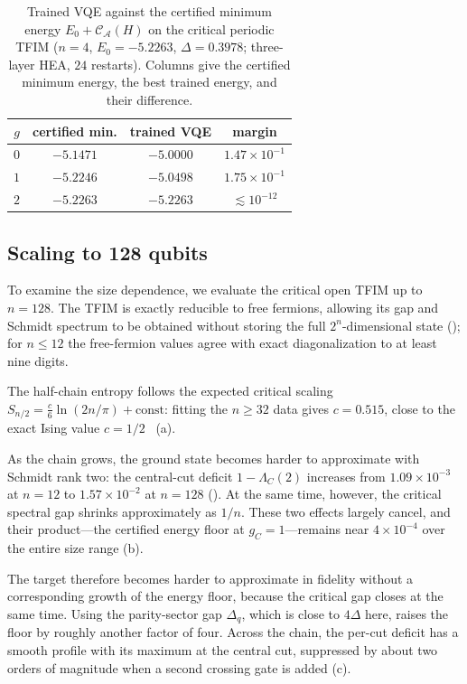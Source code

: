 \documentclass[reprint,aps,pra,floatfix,superscriptaddress,nofootinbib,longbibliography]{revtex4-2}
\theoremstyle{remark}
\theoremstyle{definition}
\newcommand{\calA}{\mathcal{A}}
\newcommand{\calC}{\mathcal{C}}
\begin{document}
\begin{table}[t]
\centering
\caption{Trained VQE against the certified minimum energy
$E_0+\calC_\calA(H)$ on the critical periodic TFIM ($n=4$, $E_0=-5.2263$,
$\Delta=0.3978$; three-layer HEA, $24$ restarts). Columns give the certified
minimum energy, the best trained energy, and their difference.}
\label{tab:vqe}
{\small\setlength{\tabcolsep}{4pt}
\begin{tabular}{rccc}
\toprule
$g$ & certified min. & trained VQE & margin\\
\midrule
$0$ & $-5.1471$ & $-5.0000$ & $1.47\times10^{-1}$\\
$1$ & $-5.2246$ & $-5.0498$ & $1.75\times10^{-1}$\\
$2$ & $-5.2263$ & $-5.2263$ & ${\lesssim}10^{-12}$\\
\bottomrule
\end{tabular}}
\end{table}

\subsection{Scaling to 128 qubits}

To examine the size dependence, we evaluate the critical open TFIM up to
$n=128$. The TFIM is exactly reducible to free fermions,
allowing its gap and Schmidt spectrum to be obtained without storing the full
$2^n$-dimensional state (); for $n\le12$ the free-fermion
values agree with exact diagonalization to at least nine digits.

The half-chain entropy follows the expected critical scaling
$S_{n/2}=\tfrac{c}{6}\ln(2n/\pi)+\mathrm{const}$: fitting the $n\ge32$ data gives
$c=0.515$, close to the exact Ising value
$c=1/2$~\cite{calabrese2004entanglement,sachdev2011quantum}
(a).

As the chain grows, the ground state becomes harder to approximate with Schmidt
rank two: the central-cut deficit $1-\Lambda_C(2)$ increases from
$1.09\times10^{-3}$ at $n=12$ to $1.57\times10^{-2}$ at $n=128$ ().
At the same time, however, the critical spectral gap shrinks approximately as
$1/n$. These two effects largely cancel, and their product---the certified
energy floor at $g_C=1$---remains near $4\times10^{-4}$ over the entire size
range (b).

The target therefore becomes harder to approximate in fidelity without a
corresponding growth of the energy floor, because the critical gap closes at the
same time. Using the
parity-sector gap $\Delta_q$, which is close to $4\Delta$ here, raises the floor
by roughly another factor of four. Across the chain, the per-cut deficit has a smooth profile with its maximum at the central cut, suppressed by about two orders of magnitude
when a second crossing gate is added (c).
\end{document}

